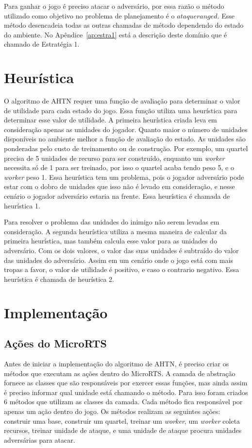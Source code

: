 Para ganhar o jogo é preciso atacar o adversário, por essa razão o método utilizado como objetivo no problema de planejamento é o $ataqueranged$.
Esse método desencadeia todas as outras chamadas de método dependendo do estado do ambiente.
No Apêndice~\ref{ap:estra1} está a descrição deste domínio que é chamado de Estratégia 1.

\section{Heurística}

O algoritmo de AHTN requer uma função de avaliação para determinar o valor de utilidade para cada estado do jogo.
Essa função utiliza uma heurística para determinar esse valor de utilidade.
A primeira heurística criada leva em consideração apenas as unidades do jogador.
Quanto maior o número de unidades disponíveis no ambiente melhor a função de avaliação do estado.
As unidades são ponderadas pelo custo de treinamento ou de construção.
Por exemplo, um quartel precisa de 5 unidades de recurso para ser construído, enquanto um \textit{worker} necessita só de 1 para ser treinado, por isso o quartel acaba tendo peso 5, e o \textit{worker} peso 1. 
Essa heurística tem um problema, pois o jogador adversário pode estar com o dobro de unidades que isso não é levado em consideração, e nesse cenário o jogador adversário estaria na frente. 
Essa heurística é chamada de heurística 1.

Para resolver o problema das unidades do inimigo não serem levadas em consideração.
A segunda heurística utiliza a mesma maneira de calcular da primeira heurística, mas também calcula esse valor para as unidades do adversário. 
Com os dois valores, o valor das suas unidades é subtraído do valor das unidades do adversário. 
Assim em um cenário onde o jogo está com mais tropas a favor, o valor de utilidade é positivo, e caso o contrario negativo.
Essa heurística é chamada de heurística 2.

\section{Implementação}


\subsection{Ações do MicroRTS}

Antes de iniciar a implementação do algoritmo de AHTN, é preciso criar os métodos que executam as ações dentro do MicroRTS. 
A camada de abstração fornece as classes que são responsáveis por exercer essas funções, mas ainda assim é preciso informar qual unidade está chamando o método.
Para isso foram criados 6 métodos que utilizam as classes da camada.
Cada método fica responsável por apenas um ação dentro do jogo.
Os métodos realizam as seguintes ações: construir uma base, construir um quartel, treinar um \textit{worker}, um \textit{worker} coleta recursos, treinar unidade de ataque, e uma unidade de ataque procura unidades adversárias para atacar.

